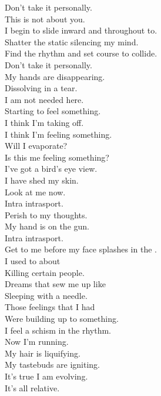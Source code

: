 

Don't take it personally. \\
This is not about you. \\
I begin to slide inward and throughout to. \\
Shatter the static silencing my mind. \\
Find the rhythm and set course to collide. \\

Don't take it personally. \\
My hands are disappearing. \\
Dissolving in a tear. \\
I am not needed here. \\

Starting to feel something. \\
I think I'm taking off. \\
I think I'm feeling something. \\
Will I evaporate? \\
Is this me feeling something? \\
I've got a bird's eye view. \\
I have shed my skin. \\
Look at me now. \\

Intra intrasport. \\
Perish to my thoughts. \\
My hand is on the gun. \\
Intra intrasport. \\
Get to me before my face splashes in the . \\

I used to  about \\
Killing certain people. \\
Dreams that sew me up like \\
Sleeping with a needle. \\
Those feelings that I had \\
Were building up to something. \\
I feel a schism in the rhythm. \\
Now I'm running. \\

My hair is liquifying. \\
My tastebuds are igniting. \\
It's true I am evolving. \\
It's all relative. \\

